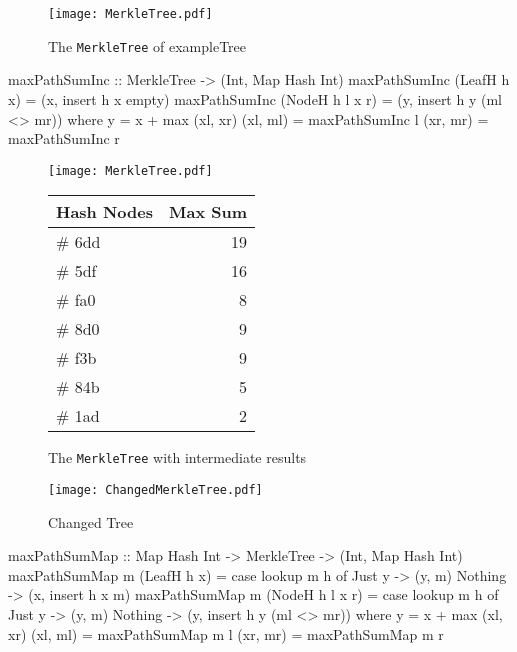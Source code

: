 \begin{figure}[H]
    \centering
    \texttt{[image: MerkleTree.pdf]}
    \caption{The \texttt{MerkleTree} of exampleTree}
\end{figure}

\begin{haskell}
maxPathSumInc :: MerkleTree -> (Int, Map Hash Int)    
maxPathSumInc (LeafH h x)     = (x, insert h x empty)
maxPathSumInc (NodeH h l x r) = (y, insert h y (ml <> mr))  
  where
    y = x + max (xl, xr)
    (xl, ml) = maxPathSumInc l
    (xr, mr) = maxPathSumInc r
\end{haskell}

\begin{figure}[H]
    \begin{minipage}[c]{0.55\textwidth}
        \centering
        \texttt{[image: MerkleTree.pdf]}
    \end{minipage}
    \hspace{0.1\textwidth}
    \begin{minipage}[c]{0.35\textwidth}
        \centering
        \begin{tabular}{|l|r|}
            \hline
            \textbf{Hash Nodes} & \textbf{Max Sum} \\
            \hline
            \# 6dd & 19 \\
            \hline
            \# 5df & 16 \\
            \hline
            \# fa0 & 8 \\
            \hline
            \# 8d0 & 9 \\
            \hline
            \# f3b & 9 \\
            \hline
            \# 84b & 5 \\
            \hline
            \# 1ad & 2 \\
            \hline
        \end{tabular}
    \end{minipage}
    \caption{The \texttt{MerkleTree} with intermediate results}    
\end{figure}

\begin{figure}[H]
    \centering
    \texttt{[image: ChangedMerkleTree.pdf]}
    \caption{Changed Tree}
\end{figure}

\begin{haskell}
maxPathSumMap :: Map Hash Int -> MerkleTree -> (Int, Map Hash Int)
maxPathSumMap m (LeafH h x) = case lookup m h of
  Just y  -> (y, m)
  Nothing -> (x, insert h x m)
maxPathSumMap m (NodeH h l x r) = case lookup m h of
  Just y  -> (y, m)
  Nothing -> (y, insert h y (ml <> mr))
    where
      y = x + max (xl, xr)
      (xl, ml) = maxPathSumMap m l
      (xr, mr) = maxPathSumMap m r  
\end{haskell}

